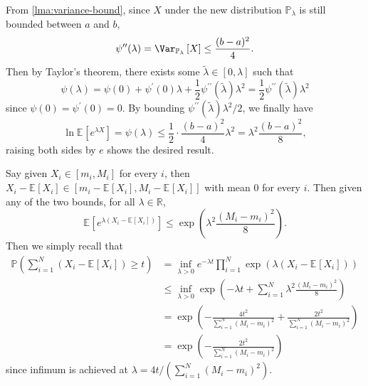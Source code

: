\begin{answer}
\begin{explanation}
		From \autoref{lma:variance-bound}, since \(X\) under the new distribution \(\mathbb{P} _\lambda \) is still bounded between \(a\) and \(b\),
		\[
			\psi ^{\prime\prime} (\lambda ) = \Var_{\mathbb{P} _\lambda }\left[X \right] \leq \frac{(b-a)^2}{4}.
		\]
		Then by Taylor's theorem, there exists some \(\widetilde{\lambda} \in [0, \lambda ]\) such that
		\[
			\psi (\lambda )
			= \psi (0) + \psi ^{\prime} (0) \lambda + \frac{1}{2} \psi ^{\prime\prime} (\widetilde{\lambda} )\lambda ^{2}
			= \frac{1}{2} \psi ^{\prime\prime} (\widetilde{\lambda} )\lambda ^{2}
		\]
		since \(\psi (0) = \psi ^{\prime} (0) = 0\). By bounding \(\psi ^{\prime\prime} (\widetilde{\lambda} )\lambda ^{2} / 2\), we finally have
		\[
			\ln \mathbb{E}_{}\left[e^{\lambda X} \right] = \psi (\lambda ) \leq \frac{1}{2}\cdot \frac{(b-a)^{2} }{4}\lambda ^{2} = \lambda ^{2} \frac{(b-a)^2}{8},
		\]
		raising both sides by \(e\) shows the desired result.
	\end{explanation}

	Say given \(X_i \in [m_i, M_i]\) for every \(i\), then \(X_i - \mathbb{E}_{}\left[X_i \right] \in [m_i - \mathbb{E}_{}\left[X_i \right] , M_i - \mathbb{E}_{}\left[X_i \right] ]\) with mean \(0\) for every \(i\). Then given any of the two bounds, for all \(\lambda \in \mathbb{R} \),
	\[
		\mathbb{E}_{}\left[e^{\lambda (X_i - \mathbb{E}_{}\left[X_i \right]) } \right]
		\leq \exp (\lambda ^2 \frac{(M_i - m_i)^2}{8}).
	\]
	Then we simply recall that
	\[
		\begin{split}
			\mathbb{P} \left( \sum_{i=1}^{N} (X_i - \mathbb{E}_{}\left[X_i \right] ) \geq t \right)
			 & = \inf _{\lambda > 0} e^{-\lambda t} \prod_{i=1}^{N} \exp (\lambda (X_i - \mathbb{E}_{}\left[X_i \right] )) \\
			 & \leq \inf _{\lambda > 0} \exp (-\lambda t + \sum_{i=1}^{N} \lambda ^2 \frac{(M_i - m_i)^2}{8})              \\
			 & = \exp (- \frac{4t^2}{\sum_{i=1}^{N} (M_i - m_i)^2} + \frac{2t^2}{\sum_{i=1}^{N} (M_i - m_i)^2})            \\
			 & = \exp (- \frac{2t^2}{\sum_{i=1}^{N} (M_i - m_i)^2})
		\end{split}
	\]
	since infimum is achieved at \(\lambda = 4t / (\sum_{i=1}^{N} (M_i - m_i)^2)\).
\end{answer}

